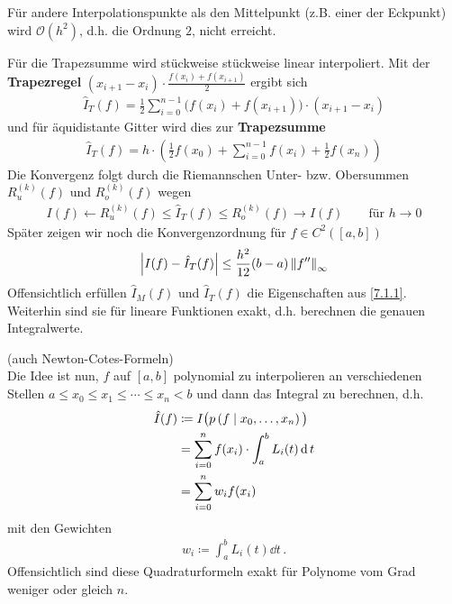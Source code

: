 Für andere Interpolationspunkte als den Mittelpunkt 
(z.B. einer der Eckpunkt) wird $\mathcal{O}(h^2)$, d.h. 
die Ordnung $2$, nicht erreicht.

Für die Trapezsumme wird stückweise stückweise linear interpoliert.
\label{im7.1.3}
Mit der \textbf{Trapezregel}
$(x_{i+1}-x_i)\cdot \frac{f(x_i)+f(x_{i+1})}{2}$
ergibt sich
\begin{gather}
   \hat{I}_T(f) = \frac{1}{2}\sum_{i=0}^{n-1}
    \big(
    f(x_i)+f(x_{i+1})
    \big)
    \cdot (x_{i+1}-x_i)
    \label{VII.1.6}
\end{gather}
und für äquidistante Gitter wird dies zur 
\textbf{Trapezsumme}
\begin{gather}
  \hat{I}_T(f) = h\cdot\left( \frac{1}{2}f(x_0)
    +\sum_{i=0}^{n-1}f(x_i)
    +\frac{1}{2} f(x_n)
  \right)
  \label{VII.1.7}
\end{gather}
Die Konvergenz folgt durch die Riemannschen Unter- bzw. Obersummen
$R_u^{(k)}(f)$ und $R_o^{(k)}(f)$ wegen
\begin{gather*}
  I(f)\longleftarrow R_u^{(k)}(f)
  \leq \hat{I}_T(f)
  \leq R_o^{(k)}(f)\longrightarrow I(f)
  \qquad \text{für } h\to 0
\end{gather*}
Später zeigen wir noch die Konvergenzordnung für $f\in C^2([a,b])$
\begin{gather}
  \left| I(f)-\hat{I}_T(f)\right| \leq \frac{h^2}{12}(b-a)\nn[f'']_\infty
  \label{VII.1.8}
\end{gather}
Offensichtlich erfüllen $\hat{I}_M(f)$ und $\hat{I}_T(f)$
die Eigenschaften aus \ref{7.1.1}.
Weiterhin sind sie für lineare Funktionen exakt,
d.h. berechnen die genauen Integralwerte.


(auch Newton-Cotes-Formeln)\\
Die Idee ist nun, $f$ auf $[a,b]$ polynomial zu interpolieren
an verschiedenen Stellen $a\leq x_0\leq x_1\leq \dotsb\leq x_n<b$
und dann das Integral zu berechnen, d.h.
\begin{align}\nonumber
  \hat{I}(f) &\coloneqq I\big( \ipol{p}{f}{x_0,\dotsc,x_n}\big)\\\nonumber
             &=\sum_{i=0}^{n}f(x_i)
               \cdot \int_a^bL_i(t)\dd t\\
             &=\sum_{i=0}^{n} w_if(x_i)
               \label{VII.2.1}
\end{align}
mit den Gewichten
\begin{gather}
  w_i\coloneqq \int_a^bL_i(t)\dd t\, .
  \label{VII.2.2}
\end{gather}
Offensichtlich sind diese Quadraturformeln exakt
für Polynome vom Grad weniger oder gleich $n$.

